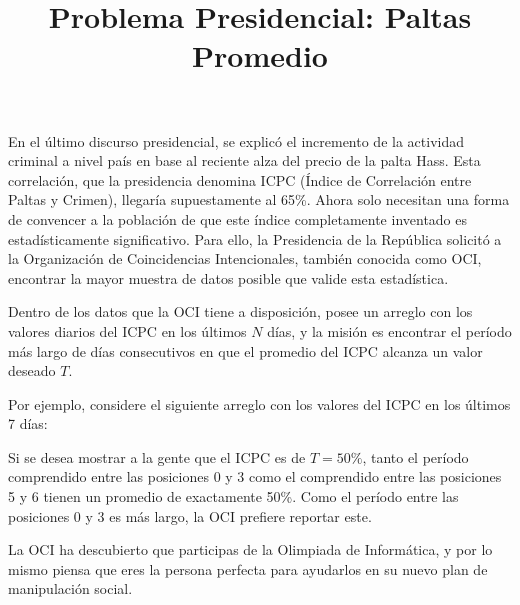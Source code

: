 \documentclass{oci}
\title{Problema Presidencial: Paltas Promedio}
\begin{document}
\begin{problemDescription}
En el último discurso presidencial, se explicó el incremento de la actividad
criminal a nivel país en base al reciente alza del precio de la palta Hass.
Esta correlación, que la presidencia denomina ICPC (Índice de Correlación entre
Paltas y Crimen), llegaría supuestamente al 65\%.
Ahora solo necesitan una forma de convencer a la población de que este índice 
completamente inventado es estadísticamente significativo.
Para ello, la Presidencia de la República solicitó a la Organización de
Coincidencias Intencionales, también conocida como OCI, encontrar la mayor
muestra de datos posible que valide esta estadística.

Dentro de los datos que la OCI tiene a disposición, posee un arreglo con los
valores diarios del ICPC en los últimos $N$ días, y la misión es encontrar el
período más largo de días consecutivos en que el promedio del ICPC alcanza un
valor deseado $T$.

Por ejemplo, considere el siguiente arreglo con los valores del ICPC en los
últimos 7 días:
\begin{center}
\end{center}

Si se desea mostrar a la gente que el ICPC es de $T=50\%$, tanto el período
comprendido entre las posiciones 0 y 3 como el comprendido entre las posiciones
5 y 6 tienen un promedio de exactamente 50\%.
Como el período entre las posiciones 0 y 3 es más largo, la OCI prefiere
reportar este.

La OCI ha descubierto que participas de la Olimpiada de Informática, y por lo mismo
piensa que eres la persona perfecta para ayudarlos en su nuevo plan de
manipulación social.
\end{problemDescription}
\end{document}
